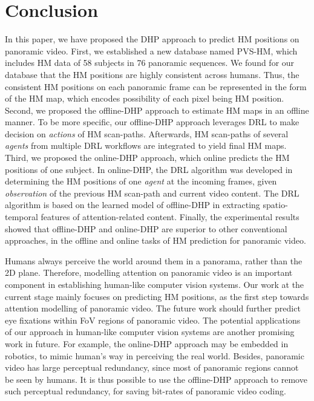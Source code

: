 \documentclass[10pt,journal,compsoc]{IEEEtran}
\begin{document}
\section{Conclusion}
In this paper, we have proposed the DHP approach to predict HM positions on panoramic video. First, we established a new database named PVS-HM, which includes HM data of 58 subjects in 76 panoramic sequences. We found for our database that the HM positions are highly consistent across humans. Thus, the consistent HM positions on each panoramic frame can be represented in the form of the HM map, which encodes possibility of each pixel being HM position. Second, we proposed the offline-DHP approach to estimate HM maps in an offline manner. To be more specific, our offline-DHP approach leverages DRL to make decision on \textit {actions} of HM scan-paths. Afterwards, HM scan-paths of several \textit{agents} from multiple DRL workflows are integrated to yield final HM maps.
Third, we proposed the online-DHP approach, which online predicts the HM positions of one subject. In online-DHP, the DRL algorithm was developed in determining the HM positions of one \textit{agent} at the incoming frames, given \textit{observation} of the previous HM scan-path and current video content. The DRL algorithm is based on the learned model of offline-DHP in extracting spatio-temporal features of attention-related content. Finally, the experimental results showed that offline-DHP and online-DHP are superior to other conventional approaches, in the offline and online tasks of HM prediction for panoramic video.

Humans always perceive the world around them in a panorama, rather than the 2D plane. Therefore, modelling attention on panoramic video is an important component in establishing human-like computer vision systems. Our work at the current stage mainly focuses on predicting HM positions, as the first step towards attention modelling of panoramic video. The future work should further predict eye fixations within FoV regions of panoramic video. The potential applications of our approach in human-like computer vision systems are another promising work in future. For example, the online-DHP approach may be embedded in robotics, to mimic human's way in perceiving the real world. Besides, panoramic video has large perceptual redundancy, since most of panoramic regions cannot be seen by humans. It is thus possible to use the offline-DHP approach to remove such perceptual redundancy, for saving bit-rates of panoramic video coding.
\end{document}
